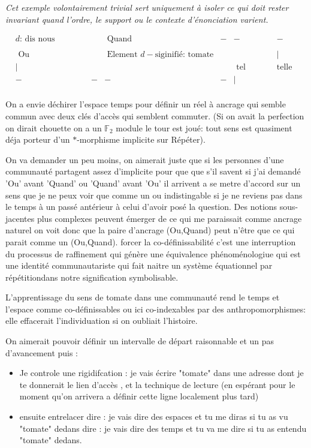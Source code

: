\documentclass{article}
\begin{document}
\emph{Cet exemple volontairement trivial sert uniquement à isoler ce qui doit rester invariant quand l’ordre, le support ou le contexte d’énonciation varient.}


 $$\begin{matrix}
& d\text{: dis nous comment,  Dolores?}&&\text{ Quand}&-&-&-\\
&&\\
&\text{ Ou}&&\text{ Element } d-\text{siginifié: }  \text{tomate}&&&|\\
&           |& && &\text{ tel endroit }& \text{telle heure}\\
&            -&-&-&-&|\\
\end{matrix}$$ 


On a envie déchirer l'espace temps pour définir un réel à ancrage qui semble commun avec deux clés d'accès qui semblent commuter. (Si on avait la perfection on dirait chouette on a un $\mathbb F_2$ module le tour est joué: tout sens est quasiment déja porteur d'un $*$-morphisme implicite sur Répéter). 

On va demander un peu moins, on aimerait juste que si les personnes d'une communauté partagent assez d'implicite pour que que s'il savent si j'ai demandé 'Ou' avant 'Quand' ou 'Quand' avant 'Ou' il arrivent a se metre d'accord sur un sens que je ne peux voir que comme un ou indistingable si je ne reviens pas dans le temps à un passé antérieur à celui d'avoir posé la question. 
Des notions sous-jacentes plus complexes peuvent émerger de ce qui me paraissait comme ancrage naturel on voit donc que la paire d'ancrage (Ou,Quand)   peut n'être que ce qui parait comme un (Ou,Quand). forcer la co-définissabilité c'est une interruption du processus de raffinement qui génère  une équivalence  phénoménologiue  qui  est une identité communautariste qui  fait naitre un système équationnel par répétitiondans  notre signification symbolisable.

 L'apprentissage du sens de tomate dans une communauté rend  le temps et l'espace comme co-définissables ou ici co-indexables par des anthropomorphismes: elle effacerait l'individuation si on oubliait l'histoire.

On aimerait pouvoir définir un intervalle de départ raisonnable et un pas d'avancement puis :

\begin{itemize}
\item Je controle une rigidifcation : je vais écrire "tomate" dans une adresse  dont je te donnerait le lien d'accès , et la technique de lecture (en espérant pour le moment qu'on arrivera a définir cette ligne localement  plus tard)
\item ensuite entrelacer
\subitem dire : je vais dire des espaces et tu me diras si tu as vu "tomate" dedans
\subitem  dire : je vais dire des temps et tu va me dire si tu as entendu "tomate" dedans.
\end{itemize}
\end{document}
